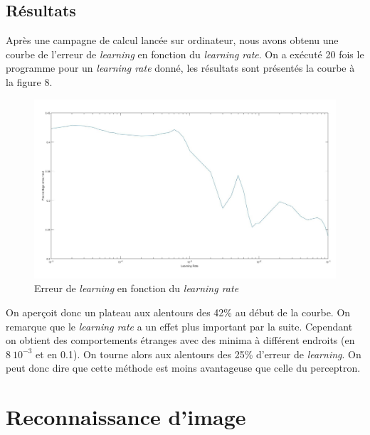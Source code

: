 \documentclass[a4paper,oneside]{report}
\begin{document}
\subsection{Résultats}

Après une campagne de calcul lancée sur ordinateur, nous avons obtenu une courbe de l'erreur de \textit{learning} en fonction du \textit{learning rate}. On a exécuté 20 fois le programme pour un \textit{learning rate} donné, les résultats sont présentés la courbe à la figure 8.

\begin{figure}[!ht]
	\begin{center}
		\includegraphics[scale=0.27]{Images/courbe_discriminative.jpg} 
	\end{center}
\caption{Erreur de \textit{learning} en fonction du \textit{learning rate}} 
\end{figure}

On aperçoit donc un plateau aux alentours des 42\% au début de la courbe. On remarque que le \textit{learning rate} a un effet plus important par la suite. Cependant on obtient des comportements étranges avec des minima à différent endroits (en $8 \ 10^{-3}$ et en 0.1). On tourne alors aux alentours des 25\% d'erreur de \textit{learning}. On peut donc dire que cette méthode est moins avantageuse que celle du perceptron.\\

\newpage

\section{Reconnaissance d'image}
\end{document}
